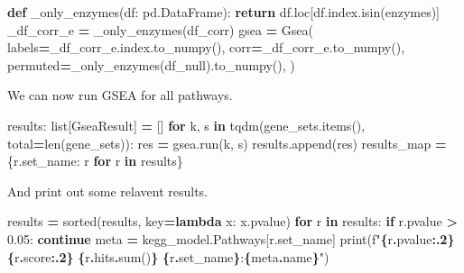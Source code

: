 \documentclass[
]{book}
\newenvironment{Shaded}{\begin{snugshade}}{\end{snugshade}}
\newcommand{\BuiltInTok}[1]{#1}
\newcommand{\ControlFlowTok}[1]{\textcolor[rgb]{0.13,0.29,0.53}{\textbf{#1}}}
\newcommand{\FloatTok}[1]{\textcolor[rgb]{0.00,0.00,0.81}{#1}}
\newcommand{\KeywordTok}[1]{\textcolor[rgb]{0.13,0.29,0.53}{\textbf{#1}}}
\newcommand{\NormalTok}[1]{#1}
\newcommand{\OperatorTok}[1]{\textcolor[rgb]{0.81,0.36,0.00}{\textbf{#1}}}
\newcommand{\SpecialCharTok}[1]{\textcolor[rgb]{0.81,0.36,0.00}{\textbf{#1}}}
\newcommand{\SpecialStringTok}[1]{\textcolor[rgb]{0.31,0.60,0.02}{#1}}
\begin{document}
\begin{Shaded}
\begin{Highlighting}[numbers=left,,]
\KeywordTok{def}\NormalTok{ \_only\_enzymes(df: pd.DataFrame):}
    \ControlFlowTok{return}\NormalTok{ df.loc[df.index.isin(enzymes)]}
\NormalTok{\_df\_corr\_e }\OperatorTok{=}\NormalTok{ \_only\_enzymes(df\_corr)}
\NormalTok{gsea }\OperatorTok{=}\NormalTok{ Gsea(}
\NormalTok{    labels}\OperatorTok{=}\NormalTok{\_df\_corr\_e.index.to\_numpy(),}
\NormalTok{    corr}\OperatorTok{=}\NormalTok{\_df\_corr\_e.to\_numpy(),}
\NormalTok{    permuted}\OperatorTok{=}\NormalTok{\_only\_enzymes(df\_null).to\_numpy(),}
\NormalTok{)}
\end{Highlighting}
\end{Shaded}

We can now run GSEA for all pathways.

\begin{Shaded}
\begin{Highlighting}[numbers=left,,]
\NormalTok{results: }\BuiltInTok{list}\NormalTok{[GseaResult] }\OperatorTok{=}\NormalTok{ []}
\ControlFlowTok{for}\NormalTok{ k, s }\KeywordTok{in}\NormalTok{ tqdm(gene\_sets.items(), total}\OperatorTok{=}\BuiltInTok{len}\NormalTok{(gene\_sets)):}
\NormalTok{    res }\OperatorTok{=}\NormalTok{ gsea.run(k, s)}
\NormalTok{    results.append(res)}
\NormalTok{results\_map }\OperatorTok{=}\NormalTok{ \{r.set\_name: r }\ControlFlowTok{for}\NormalTok{ r }\KeywordTok{in}\NormalTok{ results\}}
\end{Highlighting}
\end{Shaded}

And print out some relavent results.

\begin{Shaded}
\begin{Highlighting}[numbers=left,,]
\NormalTok{results }\OperatorTok{=} \BuiltInTok{sorted}\NormalTok{(results, key}\OperatorTok{=}\KeywordTok{lambda}\NormalTok{ x: x.pvalue)}
\ControlFlowTok{for}\NormalTok{ r }\KeywordTok{in}\NormalTok{ results:}
    \ControlFlowTok{if}\NormalTok{ r.pvalue }\OperatorTok{\textgreater{}} \FloatTok{0.05}\NormalTok{: }\ControlFlowTok{continue}
\NormalTok{    meta }\OperatorTok{=}\NormalTok{ kegg\_model.Pathways[r.set\_name]}
    \BuiltInTok{print}\NormalTok{(}\SpecialStringTok{f"}\SpecialCharTok{\{}\NormalTok{r}\SpecialCharTok{.}\NormalTok{pvalue}\SpecialCharTok{:.2\}}\SpecialStringTok{ }\SpecialCharTok{\{}\NormalTok{r}\SpecialCharTok{.}\NormalTok{score}\SpecialCharTok{:.2\}}\SpecialStringTok{ }\SpecialCharTok{\{}\NormalTok{r}\SpecialCharTok{.}\NormalTok{hits}\SpecialCharTok{.}\BuiltInTok{sum}\NormalTok{()}\SpecialCharTok{\}}\SpecialStringTok{ }\SpecialCharTok{\{}\NormalTok{r}\SpecialCharTok{.}\NormalTok{set\_name}\SpecialCharTok{\}}\SpecialStringTok{:}\SpecialCharTok{\{}\NormalTok{meta}\SpecialCharTok{.}\NormalTok{name}\SpecialCharTok{\}}\SpecialStringTok{"}\NormalTok{)}
\end{Highlighting}
\end{Shaded}
\end{document}

